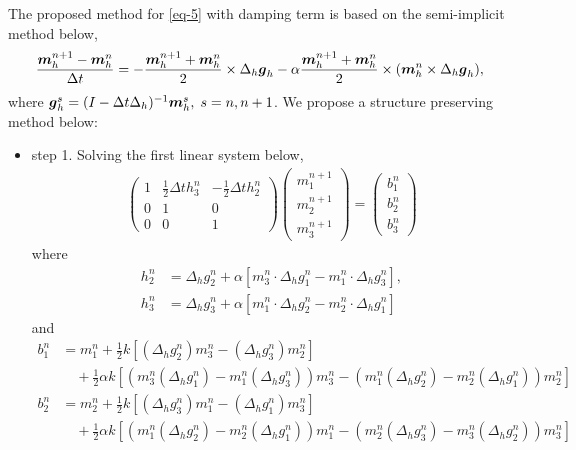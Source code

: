 \documentclass[preprint,times,3p]{elsarticle}
\def\g{\mbox{\boldmath $g$}}
\def\m{\mbox{\boldmath $m$}}
\begin{document}
The proposed method for \cref{eq-5} with damping term is based on the semi-implicit method below,
	\begin{align}\label{eq-CN_4}
	\frac{\m_h^{n+1}-\m_h^n}{\Delta t}=-\frac{\m_h^{n+1}+\m_h^n}{2} \times \Delta_h \g_h-\alpha\frac{\m_h^{n+1}+\m_h^n}{2} \times (\m_h^n\times \Delta_h \g_h),
	\end{align}
	where $\g_h^{s}=(I-\Delta t \Delta_h)^{-1}\m_h^s,\; s=n,n+1$. 
We propose a structure preserving method below:
    \begin{itemize}
        \item step 1. Solving the first linear system below,
        \begin{align*}
	\begin{pmatrix}
	1&\frac12 \Delta t h_3^n&-\frac12 \Delta t h_2^n\\
	0&1&0\\
	0&0&1
	\end{pmatrix}\begin{pmatrix}
	m_1^{n+1}\\
	m_2^{n+1}\\
	m_3^{n+1}
	\end{pmatrix}=\begin{pmatrix}
	b_1^n\\
	b_2^n\\
	b_3^n
	\end{pmatrix}
	\end{align*}
    where 
    \begin{align*}
h_2^n&=\Delta_h g_2^{n}+\alpha \left[m_3^n \cdot \Delta_hg_1^{n}-m_1^n\cdot \Delta_h g_3^{n}\right],\\
h_3^n&=\Delta_h g_3^{n}+\alpha \left[m_1^n \cdot \Delta_hg_2^{n}-m_2^n\cdot \Delta_h g_1^{n}\right]
\end{align*}
and 
\begin{align*}
b_1^n&=m_1^n+\frac12 k [( \Delta_h g_2^{n})m_3^n-( \Delta_h g_3^{n})m_2^n]\\
&\quad+\frac12 \alpha k [(m_3^n(\Delta_h g_1^{n})-m_1^n(\Delta_h g_3^{n}))m_3^n-(m_1^n(\Delta_h g_2^{n})-m_2^n(\Delta_h g_1^{n}))m_2^n]\\
b_2^n&=m_2^n+\frac12 k [(\Delta_h g_3^{n})m_1^n-(\Delta_h g_1^{n})m_3^n]\\
&\quad+\frac12 \alpha k [(m_1^n(\Delta_h g_2^{n})-m_2^n(\Delta_h g_1^{n}))m_1^n-(m_2^n(\Delta_h g_3^{n})-m_3^n(\Delta_h g_2^{n}))m_3^n]\\

\end{align*}
\end{itemize}
\end{document}

